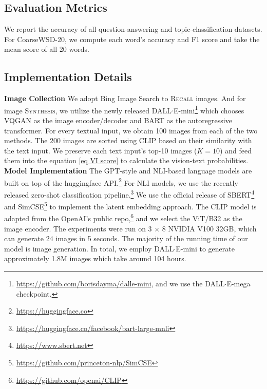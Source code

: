 \documentclass[11pt]{article}
\begin{document}
\subsection{Evaluation Metrics}
We report the accuracy of all question-answering and topic-classification datasets. For CoarseWSD-20, we compute each word's accuracy and F1 score and take the mean score of all 20 words.

\subsection{Implementation Details}
\textbf{Image Collection} We adopt Bing Image Search to \textsc{Recall} images. And for image \textsc{Synthesis}, we utilize the newly released DALL$\cdot$E-mini\footnote{\href{https://github.com/borisdayma/dalle-mini}{https://github.com/borisdayma/dalle-mini}, and we use the DALL$\cdot$E-mega checkpoint.} which chooses VQGAN \cite{esser2021taming} as the image encoder/decoder and BART \cite{lewis-etal-2020-bart} as the autoregressive transformer. For every textual input, we obtain 100 images from each of the two methods. The 200 images are sorted using CLIP based on their similarity with the text input. We preserve each text input's top-10 images ($K = 10$) and feed them into the equation \ref{eq VI score} to calculate the vision-text probabilities.
\medbreak
\noindent \textbf{Model Implementation} The GPT-style and NLI-based language models are built on top of the huggingface API.\footnote{\href{https://huggingface.co}{https://huggingface.co}} For NLI models, we use the recently released zero-shot classification pipeline.\footnote{\href{https://huggingface.co/facebook/bart-large-mnli}{https://huggingface.co/facebook/bart-large-mnli}} We use the official release of SBERT\footnote{\href{https://www.sbert.net}{https://www.sbert.net}} and SimCSE\footnote{\href{https://github.com/princeton-nlp/SimCSE}{https://github.com/princeton-nlp/SimCSE}} to implement the latent embedding approach. The CLIP model is adapted from the OpenAI's public repo,\footnote{\href{https://github.com/openai/CLIP}{https://github.com/openai/CLIP}} and we select the ViT/B32 as the image encoder. The experiments were run on 3 $\times$ 8 NVIDIA V100 32GB, which can generate 24 images in 5 seconds. The majority of the running time of our model is image generation. In total, we employ DALL$\cdot$E-mini to generate approximately 1.8M images which take around 104 hours.
\end{document}
